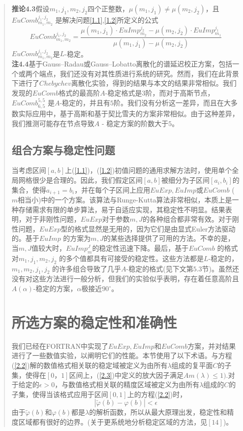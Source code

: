 \documentclass{article}
\begin{document}
\begin{CJK}{UTF8}{gkai}
\begin{quotation}
\textbf{推论4.3}假设$m_1,j_1,m_2,j_2$四个正整数，$\mu(m_1,j_1) \neq \mu(m_2,j_2)$，且$EuComb_{m_1,m_2}^{j_1,j_2}$ 是解决问题\ref{1.1},\ref{1.2}所定义的公式\\
\begin{equation}
EuComb_{m_1,m_2}^{j_1,j_2}=\frac{\mu(m_1,j_1) \cdot EuImp_{m_2}^{j_2}-\mu(m_2,j_2) \cdot EuImp_{m_1}^{j_1}}{\mu(m_1,j_1)-\mu(m_2,j_2)}
\end{equation}
$EuComb_{m_1,m_2}^{j_1,j_2}$是$L$-稳定。\\

\textbf{注4.4}基于Gauss–Radau或Gauss–Lobatto离散化的谱延迟校正方案，包括一个或两个端点，我们还没有对其性质进行系统的研究。然而，我们在此背景下进行了$Chebychev$离散化实验，得到的结果与本文的结果非常相似。我们发现的$EuComb$格式的最高阶$A$-稳定格式是$3$阶，而对于高斯节点，$EuComb_{6,5}^{5,5}$ 是$A$-稳定的，并且有$5$阶。我们没有分析这一差异，而且在大多数实际应用中，基于高斯和基于契比雪夫的方案非常相似。由于这种差异，我们推测可能存在节点导致$A$ - 稳定方案的阶数大于$5$。\\
\subsection{组合方案与稳定性问题}

当考虑区间$[a,b]$上(\ref{1.1})，(\ref{1.2})初值问题的通用求解方法时，使用单个全局网格很少是合理的。因此，我们假定区间$[a,b]$被细分为子区间$[a_i,b_i]$的集合，使得$a_{i+1}=b_i$，并在每个子区间上应用$EuExp,EuImp$或$EuComb$ ($m$相当小)中的一个方案。该算法与Runge-Kutta算法非常相似，本质上是一种存储需求有限的单步算法，易于自适应实现，其稳定性不明显。结果表明，对于非刚性问题，$EuExp$对于参数$m,J$的各种组合都非常有效。对于刚性问题，$EuExp$型的格式显然是无用的，因为它们是由显式Euler方法驱动的。基于$EuImp$ 的方案为$m,J$的某些选择提供了可用的方法。不幸的是，当$m,J$值较大时，$EuImp^{J}_{m}$的稳定性迅速下降。最后，基于$EuComb$ 的格式对$m_1,j_1,m_2,j_2$ 的多个值都具有可接受的稳定性。这些方法都是$L$-稳定的，$m_1,m_2,j_1,j_2$ 的许多组合导致了几乎$A$-稳定的格式(见下文第$5.3$节)。虽然还没有对这些方法进行一般分析，但我们的实验似乎表明，存在着任意高阶且$A(\alpha)$-稳定的方案，$\alpha$极接近$90^{\circ}$。\\
\section{所选方案的稳定性和准确性}

我们已经在FORTRAN中实现了$EuExp,EuImp$和$EuComb$方案，并对结果进行了一些数值实验，以阐明它们的性能。本节使用了以下术语。与方程(\ref{2.2})解的数值格式相关联的稳定域被定义为由所有$\lambda$组成的复平面$C$的子集，使得在$[0，1]$区间上，(\ref{2.3})中定义的放大因子满足$Am(\lambda) \leq 1)$.对于给定的$\epsilon>0$，与数值格式相关联的精度区域被定义为由所有$\lambda$组成的$C$的子集，使得当该格式应用于区间$[0,1]$上的方程(\ref{2.2})时，\\
\begin{equation}
|\widetilde {\varphi}(b)-\varphi(b)|<\epsilon
\end{equation}
由于$\widetilde {\varphi}(b)$和$\varphi(b)$都是$\lambda$的解析函数，所以从最大原理出发，稳定性和精度区域都有很好的边界。(关于更系统地分析稳定区域的方法，见$[14]$)。\\

\end{quotation}
\end{CJK}
\end{document}
